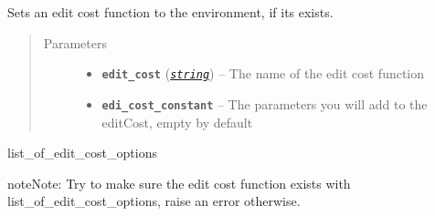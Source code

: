 \documentclass[letterpaper,10pt,english]{sphinxmanual}
\begin{document}
\begin{fulllineitems}
\label{doc:gedlibpy.set_edit_cost}
Sets an edit cost function to the environment, if its exists.
\begin{quote}\begin{description}
\item[{Parameters}] \leavevmode\begin{itemize}
\item {} 
\textbf{\texttt{edit\_cost}} (\href{https://docs.python.org/3/library/string.html\#module-string}{\emph{\texttt{string}}}) -- The name of the edit cost function

\item {} 
\textbf{\texttt{edi\_cost\_constant}} -- The parameters you will add to the editCost, empty by default

\end{itemize}

\end{description}\end{quote}




list\_of\_edit\_cost\_options



\begin{notice}{note}{Note:}
Try to make sure the edit cost function exists with list\_of\_edit\_cost\_options, raise an error otherwise.
\end{notice}

\end{fulllineitems}

\end{document}
